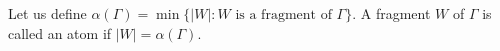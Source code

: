 Let us define $\alpha(\Gamma) = \min\{|W| : W \text{ is a fragment of } \Gamma\}$. A fragment $W$ of $\Gamma$ is called an atom if $|W| = \alpha(\Gamma)$.

